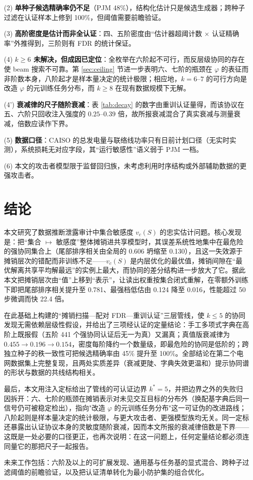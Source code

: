 \documentclass[10.5pt,compsoc,UTF8]{CjC}
\theoremstyle{mystyle}
\begin{document}
(2) \textbf{单种子候选精确率仍不足}（PJM 48\%），结构化估计只是候选生成器；跨种子过滤在认证样本上修到 100\%，但阈值需要前瞻验证。

(3) \textbf{高阶密度是估计而非全认证}：四、五阶密度由“估计器超阈计数 $\times$ 认证精确率”外推得到，三阶则有 FDR 的统计保证。

(4) \textbf{$k\ge6$ 未解决，但成因已定位}：全枚举在六阶起不可行，而反层级协同的存在使 beam 搜索不可靠。第 \ref{sec:ceiling} 节进一步表明六、七阶的瓶颈在 $\varphi$ 的表征而非阶数本身，八阶起才是样本量决定的统计极限；相应地，$k=6$--$7$ 的可行方向是改造 $\varphi$ 的元训练任务分布，而 $k\ge8$ 在现有数据规模下无解。

(4') \textbf{衰减律的尺子随阶衰减}：表 \ref{tab:decay} 的数字由重训认证量得，而该协议在五、六阶只回收注入强度的 $0.25$--$0.39$ 倍，故所报衰减混合了真实衰减与测量衰减，倍数应读作下界。

(5) \textbf{数据口径}：CAISO 的总发电量与联络线功率只有日前计划口径（无实时实测），系统损耗无对应字段，其“运行敏感性”语义弱于 PJM 一档。

(6) 本文的攻击者模型限于监督回归族，未考虑利用时序结构或外部辅助数据的更强攻击者。

\section{\heiti 结论}

本文研究了数据推断泄露审计中集合敏感度 $v_c(S)$ 的忠实估计问题。核心发现是：把“集合 $\mapsto$ 敏感度”整体摊销进共享模型时，其误差系统性地集中在最危险的强协同集合上（尾部排序相关由全局的 0.606 坍缩至 0.130），且这一失效源于摊销层次的错配而非训练不足——$v_c(S)$ 是内层优化的最优值，摊销间隙在“最优解离共享平均解最远”的实例上最大，而协同的差分结构进一步放大了它。据此本文把摊销层次由“值”上移到“表示”，让读出权重按集合闭式重解，在零额外训练下即把尾部排序相关提升至 0.781、最强档低估由 0.124 降至 0.016，性能超过 50 步微调而快 22.4 倍。

在此基础上构建的“摊销扫描—配对 FDR—重训认证”三层管线，使 $k\le5$ 的协同发现无需依赖层级性假设，并给出了三项经认证的定量结论：手工多项式字典在高阶上既报假（五阶 441 个强协同认证后无一为真）又漏真；真值版衰减律为 $0.455\to0.196\to0.154$，密度每阶降约一个数量级，即最危险的协同是低阶的；跨独立种子的秩一致性可把候选精确率由 45\% 提升至 100\%。全部结论在第二个电网数据集上完整复现，且两处实质差异（衰减更陡、字典失效更温和）提示协同谱的形状与数据的共线结构相关。

最后，本文用注入定标给出了管线的可认证边界 $k^\ast=5$，并把边界之外的失败归因拆开：六、七阶的瓶颈在摊销表示对未见交互目标的分布外（换配基字典后同一信号仍可被稳定检出），指向"改造 $\varphi$ 的元训练任务分布"这一可证伪的改进路线；八阶起则是样本量决定的统计极限，与更大攻击者、更强模型族均无关。同一定标还暴露出认证协议本身的灵敏度随阶衰减，因而本文所报的衰减律倍数是下界——这既是一处必要的口径更正，也再次说明：在这一问题上，任何定量结论都必须连同量它的那把尺子一起报告。

未来工作包括：六阶及以上的可扩展发现、通用基与任务基的显式混合、跨种子过滤阈值的前瞻验证，以及把认证清单转化为最小防护集的组合优化。

\vskip 5mm
\vspace{2mm}


\end{document}
